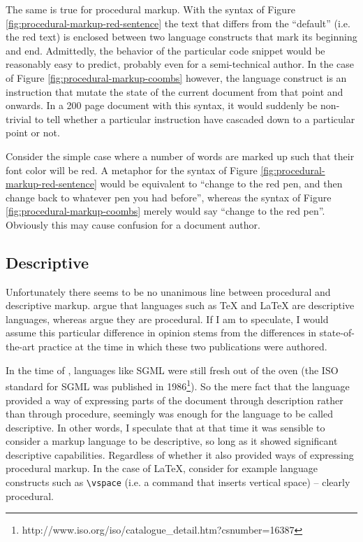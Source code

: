 \documentclass{scrreprt}
\begin{document}
The same is true for procedural markup. With the syntax of Figure \ref{fig:procedural-markup-red-sentence} the text that differs from the ``default'' (i.e. the red text) is enclosed between two language constructs that mark its beginning and end. Admittedly, the behavior of the particular code snippet would be reasonably easy to predict, probably even for a semi-technical author. In the case of Figure \ref{fig:procedural-markup-coombs} however, the language construct is an instruction that mutate the state of the current document from that point and onwards. In a 200 page document with this syntax, it would suddenly be non-trivial to tell whether a particular instruction have cascaded down to a particular point or not.

Consider the simple case where a number of words are marked up such that their font color will be red. A metaphor for the syntax of Figure \ref{fig:procedural-markup-red-sentence} would be equivalent to ``change to the red pen, and then change back to whatever pen you had before'', whereas the syntax of Figure \ref{fig:procedural-markup-coombs} merely would say ``change to the red pen''. Obviously this may cause confusion for a document author.




\subsection{Descriptive}
Unfortunately there seems to be no unanimous line between procedural and descriptive markup. \citet{coombs} argue that languages such as \TeX{} and \LaTeX{} are descriptive languages, whereas \citet{bray} argue they are procedural. If I am to speculate, I would assume this particular difference in opinion stems from the differences in state-of-the-art practice at the time in which these two publications were authored.


In the time of \citet{coombs}, languages like SGML were still fresh out of the oven (the ISO standard for SGML was published in 1986\footnote{http://www.iso.org/iso/catalogue\_detail.htm?csnumber=16387}). So the mere fact that the language provided a way of expressing parts of the document through description rather than through procedure, seemingly was enough for the language to be called descriptive. In other words, I speculate that at that time it was sensible to consider a markup language to be descriptive, so long as it showed significant descriptive capabilities. Regardless of whether it also provided ways of expressing procedural markup. In the case of \LaTeX{}, consider for example language constructs such as \texttt{\textbackslash vspace} (i.e. a command that inserts vertical space) -- clearly procedural.
\end{document}
